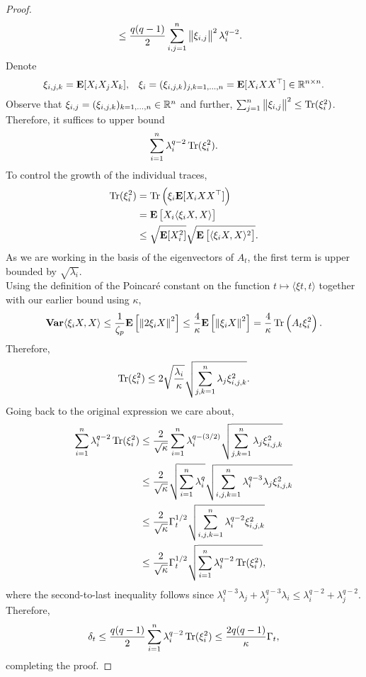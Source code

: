 \begin{proof}
\begin{align*}
					&\leq \frac{q(q-1)}{2} \sum_{i,j = 1}^n \left\lVert\xi_{i,j}\right\rVert^2 \lambda_i^{q-2}.
			\end{align*}
			Denote
			\[ \xi_{i,j,k} = \textbf{E}[X_i X_j X_k], \;\;\; \xi_{i} = (\xi_{i,j,k})_{j,k=1,\ldots,n} = \textbf{E}[X_i X X^\top] \in \mathbb{R}^{n\times n}. \]
			Observe that $\xi_{i,j} = (\xi_{i,j,k})_{k = 1,\ldots,n} \in \mathbb{R}^n$ and further, $\sum_{j=1}^n\left\lVert\xi_{i,j}\right\rVert^2 \leq \operatorname{Tr}(\xi_i^2)$. Therefore, it suffices to upper bound
			\[ \sum_{i=1}^n \lambda_i^{q-2} \operatorname{Tr}(\xi_i^2). \]
			To control the growth of the individual traces,
			\begin{align*}
				\operatorname{Tr}(\xi_i^2) &= \operatorname{Tr} \left(\xi_i \textbf{E}[ X_i X X^\top ] \right) \\
					&= \textbf{E}\left[ X_i \langle \xi_i X , X \rangle \right] \\
					&\leq \sqrt{\textbf{E}[X_i^2]} \sqrt{\textbf{E}\left[ \langle \xi_i X , X \rangle^2 \right]}.
			\end{align*}
			As we are working in the basis of the eigenvectors of $A_t$, the first term is upper bounded by $\sqrt{\lambda_i}$.\\
			Using the definition of the Poincar\'{e} constant on the function $t \mapsto \langle \xi t , t \rangle$ together with our earlier bound using $\kappa$,
			\[ \operatorname{\textbf{Var}} \langle \xi_i X, X \rangle \leq \frac{1}{\zeta_p} \textbf{E}\left[ \left\lVert 2 \xi_i X \right\rVert^2 \right] \leq \frac{4}{\kappa} \textbf{E}\left[ \left\lVert \xi_i X \right\rVert^2 \right] = \frac{4}{\kappa} \operatorname{Tr}\left(A_t \xi_i^2\right).  \]
			Therefore,
			\[ \operatorname{Tr}(\xi_i^2) \leq 2 \sqrt{\frac{\lambda_i}{\kappa}} \sqrt{ \sum_{j,k=1}^n \lambda_j \xi_{i,j,k}^2 }. \]
			Going back to the original expression we care about,
			\begin{align*}
				\sum_{i=1}^n \lambda_i^{q-2} \operatorname{Tr}(\xi_i^2) &\leq \frac{2}{\sqrt{\kappa}} \sum_{i=1}^n \lambda_i^{q-(3/2)} \sqrt{ \sum_{j,k=1}^n \lambda_j \xi_{i,j,k}^2 } \\
					&\leq \frac{2}{\sqrt{\kappa}} \sqrt{ \sum_{i=1}^n \lambda_i^q } \sqrt{ \sum_{i,j,k=1}^n \lambda_i^{q-3} \lambda_j \xi_{i,j,k}^2 } \\
					&\leq \frac{2}{\sqrt{\kappa}} \Gamma_t^{1/2} \sqrt{ \sum_{i,j,k=1}^n \lambda_i^{q-2} \xi_{i,j,k}^2 } \\
					&\leq \frac{2}{\sqrt{\kappa}} \Gamma_t^{1/2} \sqrt{ \sum_{i=1}^n \lambda_i^{q-2} \operatorname{Tr}(\xi_i^2) },
			\end{align*}
			where the second-to-last inequality follows since $\lambda_i^{q-3}\lambda_j + \lambda_j^{q-3}\lambda_i \leq \lambda_i^{q-2} + \lambda_j^{q-2}$.
			Therefore,
			\[ \delta_t \leq \frac{q(q-1)}{2} \sum_{i=1}^n \lambda_i^{q-2} \operatorname{Tr}(\xi_i^2) \leq \frac{2q(q-1)}{\kappa} \Gamma_t, \]
			completing the proof.
		\end{proof}

